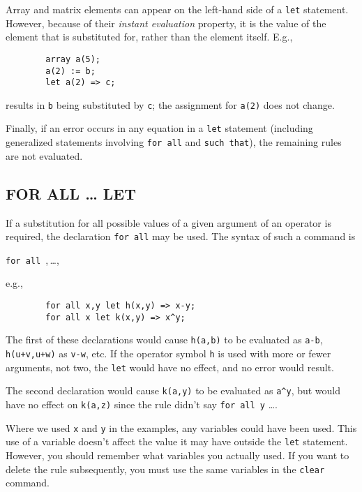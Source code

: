 Array and matrix elements can appear on the left-hand side of a \texttt{let}
statement. However, because of their
\emph{instant evaluation} property, it is the value of the element that
is substituted for, rather than the element itself.  E.g.,
\begin{verbatim}
        array a(5);
        a(2) := b;
        let a(2) => c;
\end{verbatim}
results in \texttt{b} being substituted by \texttt{c}; the assignment for
\texttt{a(2)} does not change.

Finally, if an error occurs in any equation in a \texttt{let} statement
(including generalized statements involving \texttt{for all} and
\texttt{such that}), the remaining rules are not evaluated.

\subsection{FOR ALL \ldots{} LET}
\hypertarget{command:FORALL}{}
If a substitution for all possible values of a given argument of an
operator is required, the declaration \texttt{for all} may be used. The
syntax of such a command is
\begin{syntax}
  \texttt{for all },\,\dots,\,\
\end{syntax}
e.g.,
\begin{verbatim}
        for all x,y let h(x,y) => x-y;
        for all x let k(x,y) => x^y;
\end{verbatim}
The first of these declarations would cause \texttt{h(a,b)} to be evaluated
as \texttt{a-b}, \texttt{h(u+v,u+w)} as \texttt{v-w}, etc.  If the operator
symbol \texttt{h} is used with more or fewer arguments, not two, the
\texttt{let} would have no effect, and no error would result.

The second declaration would cause \texttt{k(a,y)} to be evaluated as
\texttt{a\textasciicircum y}, but would have no effect on \texttt{k(a,z)} since the rule
didn't say \texttt{for all y} \ldots .

Where we used \texttt{x} and \texttt{y} in the examples, any variables could
have been used.  This use of a variable doesn't affect the value it may
have outside the \texttt{let} statement.  However, you should remember what
variables you actually used.  If you want to delete the rule subsequently,
you must use the same variables in the \texttt{clear} command.

